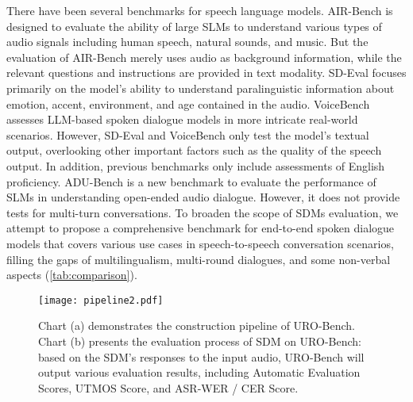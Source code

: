 There have been several benchmarks for speech language models. AIR-Bench \citep{yang2024air} is designed to evaluate the ability of large SLMs to understand various types of audio signals including human speech, natural sounds, and music. But the evaluation of AIR-Bench merely uses audio as background information, while the relevant questions and instructions are provided in text modality. SD-Eval \citep{ao2024sd} focuses primarily on the model's ability to understand paralinguistic information about emotion, accent, environment, and age contained in the audio. VoiceBench \citep{chen2024voicebench} assesses LLM-based spoken dialogue models in more intricate real-world scenarios. However, SD-Eval and VoiceBench only test the model's textual output, overlooking other important factors such as the quality of the speech output. In addition, previous benchmarks only include assessments of English proficiency. ADU-Bench \citep{gao2024adu} is a new benchmark to evaluate the performance of SLMs in understanding open-ended audio dialogue. However, it does not provide tests for multi-turn conversations. To broaden the scope of SDMs evaluation, we attempt to propose a comprehensive benchmark for end-to-end spoken dialogue models that covers various use cases in speech-to-speech conversation scenarios, filling the gaps of multilingualism, multi-round dialogues, and some non-verbal aspects (\autoref{tab:comparison}).


\begin{figure*}[t]
\centering
\texttt{[image: pipeline2.pdf]}
\caption{Chart (a) demonstrates the construction pipeline of URO-Bench. Chart (b) presents the evaluation process of SDM on URO-Bench: based on the SDM's responses to the input audio, URO-Bench will output various evaluation results, including Automatic Evaluation Scores, UTMOS Score, and ASR-WER / CER Score.}
\label{fig:pipeline}
\end{figure*}